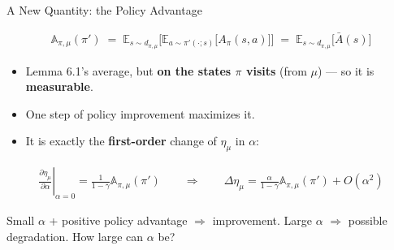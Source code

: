 \documentclass[aspectratio=169]{beamer}
\newcommand{\E}{\mathbb{E}}
\newcommand{\PA}{\mathbb{A}}              %
\begin{document}
\begin{frame}[label=policy-advantage]{A New Quantity: the Policy Advantage}
  \begin{formulabox}
    \begin{gather*}
      \PA_{\pi,\mu}(\pi') \;=\; \E_{s\sim d_{\pi,\mu}}\Big[\E_{a\sim\pi'(\cdot;s)}\big[A_\pi(s,a)\big]\Big] \;=\; \E_{s\sim d_{\pi,\mu}}\big[\bar A(s)\big]
    \end{gather*}
  \end{formulabox}
  \begin{itemize}
    \item Lemma 6.1's average, but \textbf{on the states $\pi$ visits} (from $\mu$) --- so it is \textbf{measurable}.
    \item One step of policy improvement maximizes it.
    \item It is exactly the \textbf{first-order} change of $\eta_\mu$ in $\alpha$: \hfill \hyperlink{proof-pa-1}{}
  \end{itemize}
  \begin{gather*}
    \left.\frac{\partial \eta_\mu}{\partial \alpha}\right|_{\alpha=0} = \frac{1}{1-\gamma}\PA_{\pi,\mu}(\pi')
    \qquad\Longrightarrow\qquad
    \Delta\eta_\mu = \frac{\alpha}{1-\gamma}\PA_{\pi,\mu}(\pi') + O(\alpha^2)
  \end{gather*}
  \begin{goodbox}
    \small Small $\alpha$ + positive policy advantage $\Rightarrow$ improvement. Large $\alpha$ $\Rightarrow$ possible degradation. How large can $\alpha$ be?
  \end{goodbox}
\end{frame}
\end{document}
